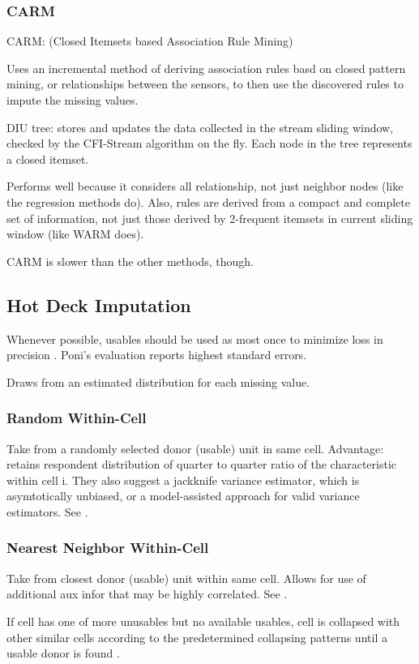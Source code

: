 \documentclass{article}
\begin{document}
\subsubsection{CARM}
CARM: (Closed Itemsets based Association Rule Mining)

Uses an incremental method of deriving association rules basd on closed pattern mining, or relationships between the sensors, to then use the discovered rules to impute the missing values.

DIU tree: stores and updates the data collected in the stream sliding window, checked by the CFI-Stream algorithm on the fly. Each node in the tree represents a closed itemset. 

Performs well because it considers all relationship, not just neighbor nodes (like the regression methods do). Also, rules are derived from a compact and complete set of information, not just those derived by 2-frequent itemsets in current sliding window (like WARM does).

CARM is slower than the other methods, though.

\subsection{Hot Deck Imputation}
Whenever possible, usables should be used as most once to minimize loss in precision \cite{poni}. Poni's evaluation reports highest standard errors.

Draws from an estimated distribution for each missing value. \cite{myrt}


\subsubsection{Random Within-Cell}
Take from a randomly selected donor (usable) unit in same cell. Advantage: retains respondent distribution of quarter to quarter ratio of the characteristic within cell i. They also suggest a jackknife variance estimator, which is asymtotically unbiased, or a model-assisted approach for valid variance estimators. See \cite{poni}.

\subsubsection{Nearest Neighbor Within-Cell}
Take from closest donor (usable) unit within same cell. Allows for use of additional aux infor that may be highly correlated. See \cite{poni}.

If cell has one of more unusables but no available usables, cell is collapsed with other similar cells according to the predetermined collapsing patterns until a usable donor is found \cite{poni}.
\end{document}
